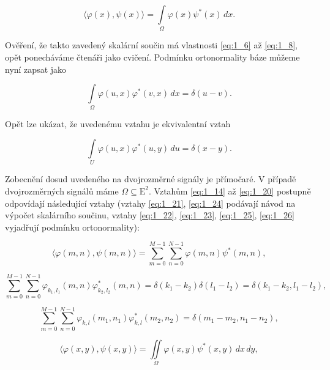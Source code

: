 \begin{equation} \label{eq:1_18}
    \langle \varphi(x), \psi(x) \rangle = \int\limits_\Omega \varphi(x) \psi^*(x)\, dx.
\end{equation}

\noindent Ověření, že takto zavedený skalární součin má vlastnosti \eqref{eq:1_6} až \eqref{eq:1_8}, opět ponecháváme čtenáři jako cvičení. Podmínku ortonormality báze můžeme nyní zapsat jako

\begin{equation} \label{eq:1_19}
    \int\limits_\Omega \varphi(u, x) \varphi^*(v, x)\, dx = \delta(u - v).
\end{equation}

\noindent Opět lze ukázat, že uvedenému vztahu je ekvivalentní vztah

\begin{equation} \label{eq:1_20}
    \int\limits_U \varphi(u, x) \varphi^*(u, y)\, du = \delta(x - y).
\end{equation}

Zobecnění dosud uvedeného na dvojrozměrné signály je přímočaré. V případě dvojrozměrných signálů máme $\Omega \subseteq \mathrm{E}^2$. Vztahům \eqref{eq:1_14} až \eqref{eq:1_20} postupně odpovídají následující vztahy (vztahy \eqref{eq:1_21}, \eqref{eq:1_24} podávají návod na výpočet skalárního součinu, vztahy \eqref{eq:1_22}, \eqref{eq:1_23}, \eqref{eq:1_25}, \eqref{eq:1_26} vyjadřují podmínku ortonormality):

\begin{equation} \label{eq:1_21}
    \langle \varphi(m, n), \psi(m, n) \rangle = \sum\limits_{m=0}^{M-1} \sum\limits_{n=0}^{N-1} \varphi(m, n) \psi^*(m, n),
\end{equation}

\begin{equation} \label{eq:1_22}
    \sum\limits_{m=0}^{M-1} \sum\limits_{n=0}^{N-1} \varphi_{k_1, l_1} (m, n) \varphi_{k_2, l_2}^*(m, n) = \delta(k_1 - k_2) \delta(l_1 - l_2) = \delta(k_1 - k_2, l_1 - l_2),
\end{equation}

\begin{equation} \label{eq:1_23}
    \sum\limits_{m=0}^{M-1} \sum\limits_{n=0}^{N-1} \varphi_{k, l} (m_1, n_1) \varphi_{k, l}^*(m_2, n_2) = \delta(m_1 - m_2, n_1 - n_2),
\end{equation}

\begin{equation} \label{eq:1_24}
    \langle \varphi(x, y), \psi(x, y) \rangle = \iint\limits_{\Omega} \varphi(x, y) \psi^*(x, y)\, dx\, dy,
\end{equation}

